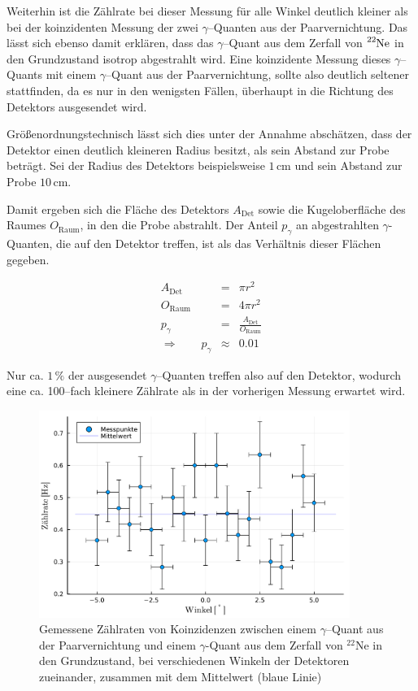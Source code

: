 \documentclass[12pt,a4paper]{scrartcl}
\numberwithin{equation}{section} %
\begin{document}
Weiterhin ist die Zählrate bei dieser Messung für alle Winkel deutlich kleiner als bei der koinzidenten Messung der zwei $\gamma$--Quanten aus der Paarvernichtung. Das lässt sich ebenso damit erklären, dass das $\gamma$--Quant aus dem Zerfall von $\ce{^{22}Ne}$ in den Grundzustand isotrop abgestrahlt wird. Eine koinzidente Messung dieses $\gamma$--Quants mit einem $\gamma$--Quant aus der Paarvernichtung, sollte also deutlich seltener stattfinden, da es nur in den wenigsten Fällen, überhaupt in die Richtung des Detektors ausgesendet wird.

Größenordnungstechnisch lässt sich dies unter der Annahme abschätzen, dass der Detektor einen deutlich kleineren Radius besitzt, als sein Abstand zur Probe beträgt. Sei der Radius des Detektors beispielsweise $1 \mathrm{\, cm}$ und sein Abstand zur Probe $10 \mathrm{\, cm}$.

Damit ergeben sich die Fläche des Detektors $A_\mathrm{Det}$ sowie die Kugeloberfläche des Raumes $O_\mathrm{Raum}$, in den die Probe abstrahlt. Der Anteil $p_\gamma$ an abgestrahlten $\gamma$-Quanten, die auf den Detektor treffen, ist als das Verhältnis dieser Flächen gegeben.

\begin{eqnarray}
	A_\mathrm{Det} &=& \pi r^2 \\
	O_\mathrm{Raum} &=& 4 \pi r^2 \\
	p_\gamma &=& \frac{A_\mathrm{Det}}{O_\mathrm{Raum}} \\
	\Rightarrow \qquad p_\gamma &\approx& 0.01
\end{eqnarray}

\noindent
Nur ca. $1 \mathrm{\, \%}$ der ausgesendet $\gamma$--Quanten treffen also auf den Detektor, wodurch eine ca. 100--fach kleinere Zählrate als in der vorherigen Messung erwartet wird.

\begin{figure}[h]
	\centering
	\includegraphics[width=0.9\textwidth]{../media/B3.4/plot1275.pdf}
	\caption{Gemessene Zählraten von Koinzidenzen zwischen einem $\gamma$--Quant aus der Paarvernichtung und einem $\gamma$-Quant aus dem Zerfall von $^{22}$Ne in den Grundzustand, bei verschiedenen Winkeln der Detektoren zueinander, zusammen mit dem Mittelwert (blaue Linie)}
	\label{fig:plot1275}
\end{figure}
\end{document}
